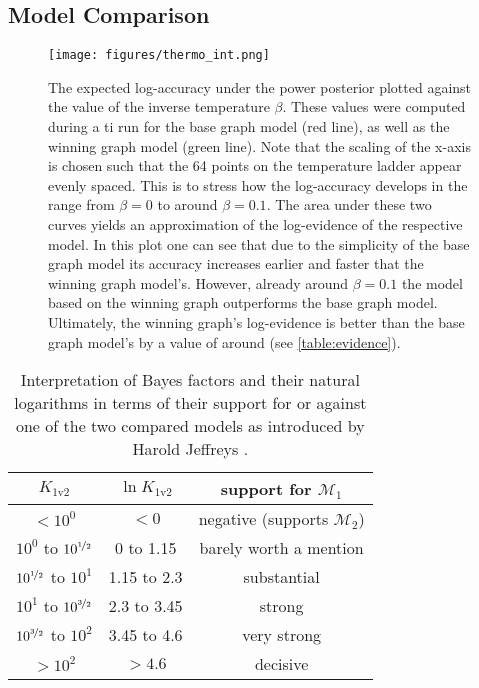 \documentclass[twocolumn]{aastex631}
\begin{document}
\subsection{Model Comparison}
\label{subsec:complete_model:comparison}

\begin{figure}
    \centering
    \texttt{[image: figures/thermo\_int.png]}
    \caption{The expected log-accuracy under the power posterior plotted against the value of the inverse temperature $\beta$. These values were computed during a \gls{ti} run for the base graph model (red line), as well as the winning graph model (green line). Note that the scaling of the x-axis is chosen such that the 64 points on the temperature ladder appear evenly spaced. This is to stress how the log-accuracy develops in the range from $\beta=0$ to around $\beta=0.1$. The area under these two curves yields an approximation of the log-evidence of the respective model. In this plot one can see that due to the simplicity of the base graph model its accuracy increases earlier and faster that the winning graph model's. However, already around $\beta=0.1$ the model based on the winning graph outperforms the base graph model. Ultimately, the winning graph's log-evidence is better than the base graph model's by a value of around  (see \cref{table:evidence}).}
    \label{fig:thermo_int}
\end{figure}

\begin{table}
    \centering
    \begin{tabular}{ | c | c | c | }
        \hline
        $K_\text{1v2}$ & $\ln{K_\text{1v2}}$ & support for $\mathcal{M}_1$ \\
        \hline
        $< 10^0$ & $< 0$ & negative (supports $\mathcal{M}_2$) \\
        $10^0$ to $10^{\nicefrac{1}{2}}$ & 0 to 1.15 & barely worth a mention \\
        $10^{\nicefrac{1}{2}}$ to $10^1$ & 1.15 to 2.3 & substantial \\
        $10^1$ to $10^{\nicefrac{3}{2}}$ & 2.3 to 3.45 & strong \\
        $10^{\nicefrac{3}{2}}$ to $10^2$ & 3.45 to 4.6 & very strong \\
        $> 10^2$ & $> 4.6$ & decisive \\
        \hline
    \end{tabular}
    \caption{Interpretation of Bayes factors and their natural logarithms in terms of their support for or against one of the two compared models as introduced by Harold Jeffreys \cite{jeffreys_theory_1998}.}
    \label{table:bayes_factor}
\end{table}
\end{document}
